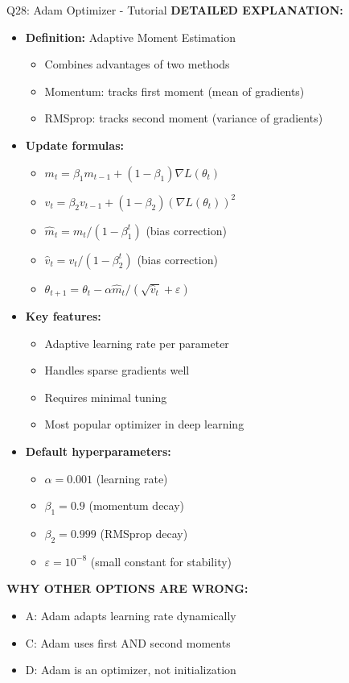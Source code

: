 \documentclass[8pt]{beamer}
\begin{document}
\begin{frame}{Q28: Adam Optimizer - Tutorial}
		\vspace{0.05cm}
		\textbf{DETAILED EXPLANATION:}
		\begin{itemize}
			\item \textbf{Definition:} Adaptive Moment Estimation
			\begin{itemize}
				\item Combines advantages of two methods
				\item Momentum: tracks first moment (mean of gradients)
				\item RMSprop: tracks second moment (variance of gradients)
			\end{itemize}
			\item \textbf{Update formulas:}
			\begin{itemize}
				\item $m_t = \beta_1 m_{t-1} + (1-\beta_1)\nabla L(\theta_t)$
				\item $v_t = \beta_2 v_{t-1} + (1-\beta_2)(\nabla L(\theta_t))^2$
				\item $\hat{m}_t = m_t / (1-\beta_1^t)$ (bias correction)
				\item $\hat{v}_t = v_t / (1-\beta_2^t)$ (bias correction)
				\item $\theta_{t+1} = \theta_t - \alpha \hat{m}_t / (\sqrt{\hat{v}_t} + \varepsilon)$
			\end{itemize}
			\item \textbf{Key features:}
			\begin{itemize}
				\item Adaptive learning rate per parameter
				\item Handles sparse gradients well
				\item Requires minimal tuning
				\item Most popular optimizer in deep learning
			\end{itemize}
			\item \textbf{Default hyperparameters:}
			\begin{itemize}
				\item $\alpha = 0.001$ (learning rate)
				\item $\beta_1 = 0.9$ (momentum decay)
				\item $\beta_2 = 0.999$ (RMSprop decay)
				\item $\varepsilon = 10^{-8}$ (small constant for stability)
			\end{itemize}
		\end{itemize}
		
		\vspace{0.05cm}
		\textcolor{myred}{\textbf{WHY OTHER OPTIONS ARE WRONG:}}
		\begin{itemize}
			\item \textcolor{myred}{A:} Adam adapts learning rate dynamically
			\item \textcolor{myred}{C:} Adam uses first AND second moments
			\item \textcolor{myred}{D:} Adam is an optimizer, not initialization
		\end{itemize}
		

\end{frame}
\end{document}
